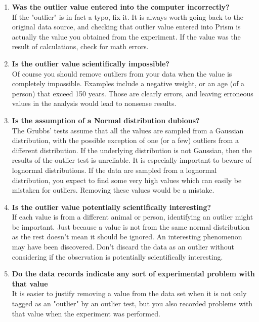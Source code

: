 \begin{enumerate}
\item	\textbf{Was the outlier value entered into the computer incorrectly?}\\
If the "outlier" is in fact a typo, fix it. It is always worth going back to the original data source, and checking that outlier value entered into Prism is actually the value you obtained from the experiment. If the value was the result of calculations, check for math errors.

\item\textbf{	Is the outlier value scientifically impossible?}\\
Of course you should remove outliers from your data when the value is completely impossible. Examples include a negative weight, or an age (of a person) that exceed 150 years. Those are clearly errors, and leaving erroneous values in the analysis would lead to nonsense results.

\item	\textbf{Is the assumption of a Normal distribution dubious?}\\
The Grubbs' tests assume that all the values are sampled from a Gaussian distribution, with the possible exception of one (or a few) outliers from a different distribution. If the underlying distribution is not Gaussian, then the results of the outlier test is unreliable. It is especially important to beware of lognormal distributions. If the data are sampled from a lognormal distribution, you expect to find some very high values which can easily be mistaken for outliers. Removing these values would be a mistake.

\item	\textbf{Is the outlier value potentially scientifically interesting?}\\
If each value is from a different animal or person, identifying an outlier might be important. Just because a value is not from the same normal distribution as the rest doesn't mean it should be ignored. An interesting phenomenon may have been discovered. Don't discard  the data as an outlier without considering if the observation is potentially scientifically interesting. 

\item	 \textbf{Do the data records indicate any sort of experimental problem with that value}\\
It is easier to justify removing a value from the data set when it is not only tagged as an "outlier" by an outlier test, but you also recorded problems with that value when the experiment was performed.


\end{enumerate}
